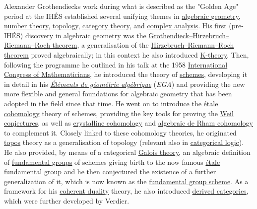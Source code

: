Alexander Grothendieck\textquotesingle s work during what is described as the "Golden Age" period at the IHÉS established several unifying themes in \href{https://en.wikipedia.org/wiki/Algebraic_geometry}{algebraic geometry}, \href{https://en.wikipedia.org/wiki/Number_theory}{number theory}, \href{https://en.wikipedia.org/wiki/Topology}{topology}, \href{https://en.wikipedia.org/wiki/Category_theory}{category theory}, and \href{https://en.wikipedia.org/wiki/Complex_analysis}{complex analysis}. His first (pre-IHÉS) discovery in algebraic geometry was the \href{https://en.wikipedia.org/wiki/Grothendieck–Hirzebruch–Riemann–Roch_theorem}{Grothendieck--Hirzebruch--Riemann--Roch theorem}, a generalisation of the \href{https://en.wikipedia.org/wiki/Hirzebruch–Riemann–Roch_theorem}{Hirzebruch--Riemann--Roch theorem} proved algebraically; in this context he also introduced \href{https://en.wikipedia.org/wiki/K-theory}{K-theory}. Then, following the programme he outlined in his talk at the 1958 \href{https://en.wikipedia.org/wiki/International_Congress_of_Mathematicians}{International Congress of Mathematicians}, he introduced the theory of \href{https://en.wikipedia.org/wiki/Scheme_(mathematics)}{schemes}, developing it in detail in his \emph{\href{https://en.wikipedia.org/wiki/Éléments_de_géométrie_algébrique}{Éléments de géométrie algébrique}} (\emph{EGA}) and providing the new more flexible and general foundations for algebraic geometry that has been adopted in the field since that time. He went on to introduce the \href{https://en.wikipedia.org/wiki/Étale_cohomology}{étale cohomology} theory of schemes, providing the key tools for proving the \href{https://en.wikipedia.org/wiki/Weil_conjectures}{Weil conjectures}, as well as \href{https://en.wikipedia.org/wiki/Crystalline_cohomology}{crystalline cohomology} and \href{https://en.wikipedia.org/wiki/Algebraic_de_Rham_cohomology}{algebraic de Rham cohomology} to complement it. Closely linked to these cohomology theories, he originated \href{https://en.wikipedia.org/wiki/Topos}{topos} theory as a generalisation of topology (relevant also in \href{https://en.wikipedia.org/wiki/Categorical_logic}{categorical logic}). He also provided, by means of a categorical \href{https://en.wikipedia.org/wiki/Galois_theory}{Galois theory}, an algebraic definition of \href{https://en.wikipedia.org/wiki/Fundamental_group}{fundamental groups} of schemes giving birth to the now famous \href{https://en.wikipedia.org/wiki/Étale_fundamental_group}{étale fundamental group} and he then conjectured the existence of a further generalization of it, which is now known as the \href{https://en.wikipedia.org/wiki/Fundamental_group_scheme}{fundamental group scheme}. As a framework for his \href{https://en.wikipedia.org/wiki/Coherent_duality}{coherent duality} theory, he also introduced \href{https://en.wikipedia.org/wiki/Derived_category}{derived categories}, which were further developed by Verdier.

